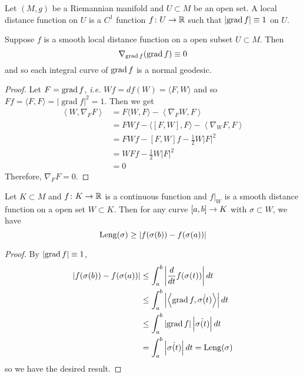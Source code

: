 \begin{enumerate}[label=\arabic{*}.]
	\begin{defn}
	    Let $(M,g)$ be a Riemannian manifold and $U \subset M$ be an open set. A local distance function on $U$ is a $C^1$ function $f \colon U \rightarrow \mathbb{R}$ such that $\left\lvert\operatorname{grad} f\right\lvert \equiv 1$ on $U$.
	\end{defn}

	\begin{thm}
	    Suppose $f$ is a smooth local distance function on a open subset $U \subset M$. Then
	    \begin{equation*}
	        \nabla_{\operatorname{grad}f}(\operatorname{grad}f) \equiv 0
	    \end{equation*}
	    and so each integral curve of $\operatorname{grad} f$ is a normal geodesic.
	\end{thm}
	\begin{proof}
	    Let $F = \operatorname{grad} f$, \emph{i.e.} $W f=d f(W)=\langle F, W\rangle$ and so $F f=\langle F, F\rangle=|\operatorname{grad} f|^2=1$. Then we get
	    \begin{equation*}
	        \begin{aligned}
				\left\langle W, \nabla_F F\right\rangle & =F\langle W, F\rangle-\left\langle\nabla_F W, F\right\rangle \\
				& =F W f-\langle[F, W], F\rangle-\left\langle\nabla_W F, F\right\rangle \\
				& =F W f-[F, W] f-\frac{1}{2} W|F|^2 \\
				& =W F f-\frac{1}{2} W|F|^2 \\
				& =0
			\end{aligned}
	    \end{equation*}
	    Therefore, $\nabla_F F = 0$.
	\end{proof}

	\begin{lem}
	    Let $K \subset M$ and $f \colon K \rightarrow \mathbb{R}$ is a continuous function and $f|_W$ is a smooth distance function on a open set $W \subset K$. Then for any curve $[a,b] \rightarrow K$ with $\sigma \subset W$, we have
	    \begin{equation*}
	        \operatorname{Leng}(\sigma) \geq \left\lvert f(\sigma(b)) - f(\sigma(a))\right\lvert
	    \end{equation*}
	\end{lem}
	\begin{proof}
	    By $\left\lvert\operatorname{grad} f\right\lvert \equiv 1$,
	    \begin{equation*}
	        \begin{aligned}
	        	\left\lvert f(\sigma(b)) - f(\sigma(a))\right\lvert &\leq \int_a^b \left\lvert\frac{d}{dt}f(\sigma(t))\right\lvert dt \\
	        	&\leq \int_a^b \left\lvert\left\langle \operatorname{grad} f, \dot{\sigma(t)} \right\rangle\right\lvert dt \\
	        	&\leq \int_a^b \left\lvert\operatorname{grad} f\right\lvert \left\lvert\dot{\sigma(t)}\right\lvert dt \\
	        	&= \int_a^b \left\lvert\dot{\sigma(t)}\right\lvert dt = \operatorname{Leng}(\sigma)\\
	        \end{aligned}
	    \end{equation*}
	    so we have the desired result.
	\end{proof}


\end{enumerate}
